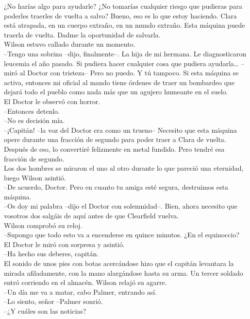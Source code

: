 ¿No harías algo para ayudarle? ¿No tomarías cualquier riesgo que
pudieras para poderles traerles de vuelta a salvo? Bueno, eso es lo que
estoy haciendo. Clara está atrapada, en un cuerpo extraño, en un mundo
extraño. Esta máquina puede traerla de vuelta. Dadme la oportunidad de
salvarla.\\
Wilson estuvo callado durante un momento.\\
--Tengo una sobrina --dijo, finalmente--. La hija de mi hermana. Le
diagnosticaron leucemia el año pasado. Si pudiera hacer cualquier cosa
que pudiera ayudarla\ldots{} --miró al Doctor con tristeza-- Pero no
puedo. Y tú tampoco. Si esta máquina se activa, entonces mi oficial al
mando tiene órdenes de traer un bombardeo que dejará todo el pueblo como
nada más que un agujero humeante en el suelo.\\
El Doctor le observó con horror.\\
--Entonces detenlo.\\
--No es decisión mía.\\
--¡Capitán! --la voz del Doctor era como un trueno-- Necesito que esta
máquina opere durante una fracción de segundo para poder traer a Clara
de vuelta. Después de eso, lo convertiré felizmente en metal fundido.
Pero tendré esa fracción de segundo.\\
Los dos hombres se miraron el uno al otro durante lo que pareció una
eternidad, luego Wilson asintió.\\
--De acuerdo, Doctor. Pero en cuanto tu amiga esté segura, destruimos
esta máquina.\\
--Os doy mi palabra --dijo el Doctor con solemnidad--. Bien, ahora
necesito que vosotros dos salgáis de aquí antes de que Clearfield
vuelva.\\
Wilson comprobó su reloj.\\
--Supongo que todo esto va a encenderse en quince minutos. ¿En el
equinoccio?\\
El Doctor le miró con sorpresa y asintió.\\
--Ha hecho sus deberes, capitán.\\
El sonido de unos pies con botas acercándose hizo que el capitán
levantara la mirada afiladamente, con la mano alargándose hasta su arma.
Un tercer soldado entró corriendo en el almacén. Wilson relajó su
agarre.\\
--Un día me va a matar, cabo Palmer, entrando así.\\
--Lo siento, señor --Palmer sonrió.\\
--¿Y cuáles son las noticias?\\
